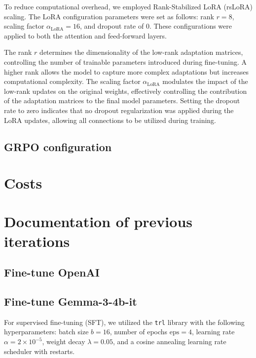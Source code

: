 \documentclass[11pt]{article}
\begin{document}
To reduce computational overhead, we employed Rank-Stabilized LoRA (rsLoRA) scaling. The LoRA configuration parameters were set as follows: rank \( r = 8 \), scaling factor \( \alpha_{\text{LoRA}} = 16 \), and dropout rate of 0. These configurations were applied to both the attention and feed-forward layers.

The rank \( r \) determines the dimensionality of the low-rank adaptation matrices, controlling the number of trainable parameters introduced during fine-tuning. A higher rank allows the model to capture more complex adaptations but increases computational complexity. The scaling factor \( \alpha_{\text{LoRA}} \) modulates the impact of the low-rank updates on the original weights, effectively controlling the contribution of the adaptation matrices to the final model parameters. Setting the dropout rate to zero indicates that no dropout regularization was applied during the LoRA updates, allowing all connections to be utilized during training.


\subsection{GRPO configuration} \label{app:grpo-config}

\section{Costs} \label{app:cost}

\section{Documentation of previous iterations} \label{app:previous-iterations}
\subsection{Fine-tune OpenAI} \label{app:openai-finetune}

\subsection{Fine-tune Gemma-3-4b-it} \label{app:gemma-finetune}

For supervised fine-tuning (SFT), we utilized the \texttt{trl} library with the following hyperparameters: batch size \( b = 16 \), number of epochs \( \text{eps} = 4 \), learning rate \( \alpha = 2 \times 10^{-5} \), weight decay \( \lambda = 0.05 \), and a cosine annealing learning rate scheduler with restarts.
\end{document}

